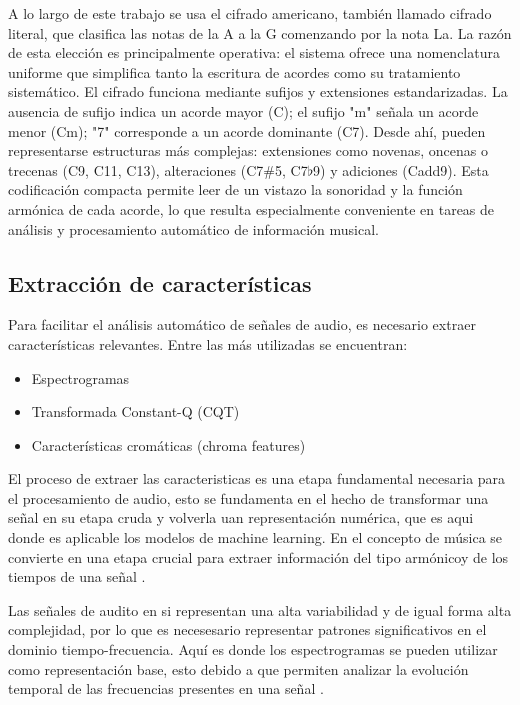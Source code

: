 A lo largo de este trabajo se usa el cifrado americano, también llamado cifrado literal, que clasifica las notas de la A a la G comenzando por la nota La. La razón de esta elección es principalmente operativa: el sistema ofrece una nomenclatura uniforme que simplifica tanto la escritura de acordes como su tratamiento sistemático.
El cifrado funciona mediante sufijos y extensiones estandarizadas. La ausencia de sufijo indica un acorde mayor (C); el sufijo "m" señala un acorde menor (Cm); "7" corresponde a un acorde dominante (C7). Desde ahí, pueden representarse estructuras más complejas: extensiones como novenas, oncenas o trecenas (C9, C11, C13), alteraciones (C7\#5, C7$\flat$9) y adiciones (Cadd9). Esta codificación compacta permite leer de un vistazo la sonoridad y la función armónica de cada acorde, lo que resulta especialmente conveniente en tareas de análisis y procesamiento automático de información musical.

\subsection{Extracción de características}

Para facilitar el análisis automático de señales de audio, es necesario extraer características relevantes. Entre las más utilizadas se encuentran:

\begin{itemize}
\item Espectrogramas
\item Transformada Constant-Q (CQT)
\item Características cromáticas (chroma features)
\end{itemize}

El proceso de extraer las caracteristicas es una etapa fundamental necesaria para el procesamiento de audio, esto se fundamenta en el hecho de transformar una señal en su etapa cruda y volverla uan representación numérica, que es aqui donde es aplicable los modelos de machine learning. En el concepto de música se convierte en una etapa crucial para extraer información del tipo armónicoy de los tiempos de una señal \cite{benetos2019automatic, jamshidi2024machine}.

Las señales de audito en si representan una alta variabilidad y de igual forma alta complejidad, por lo que es necesesario representar patrones significativos en el dominio tiempo-frecuencia. Aquí es donde los espectrogramas se pueden utilizar como representación base, esto debido a que permiten analizar la evolución temporal de las frecuencias presentes en una señal \cite{roman2020data}.

